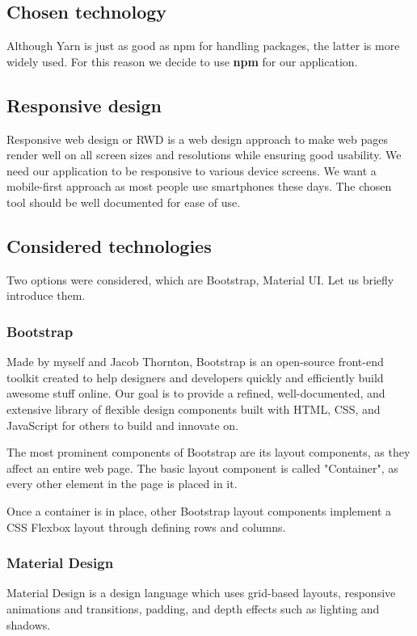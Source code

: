   \subsection*{Chosen technology}
  Although Yarn is just as good as npm for handling packages, the latter is more widely used.
  For this reason we decide to use \textbf{npm} for our application. 

\subsection{Responsive design}
  Responsive web design or RWD is a web design approach to make web pages render well on all screen sizes and resolutions while ensuring good usability.
  We need our application to be responsive to various device screens.
  We want a mobile-first approach as most people use smartphones these days.
  The chosen tool should be well documented for ease of use.

  \subsection*{Considered technologies}
  Two options were considered, which are Bootstrap, Material UI.
  Let us briefly introduce them.

  \subsubsection*{Bootstrap}
  Made by myself and Jacob Thornton, Bootstrap is an open-source front-end toolkit created to help designers and developers quickly and efficiently build awesome stuff online. Our goal is to provide a refined, well-documented, and extensive library of flexible design components built with HTML, CSS, and JavaScript for others to build and innovate on.

  The most prominent components of Bootstrap are its layout components, as they affect an entire web page. The basic layout component is called "Container", as every other element in the page is placed in it.

  Once a container is in place, other Bootstrap layout components implement a CSS Flexbox layout through defining rows and columns.

  \subsubsection*{Material Design}
  Material Design is a design language which uses grid-based layouts, responsive animations and transitions, padding, and depth effects such as lighting and shadows.

